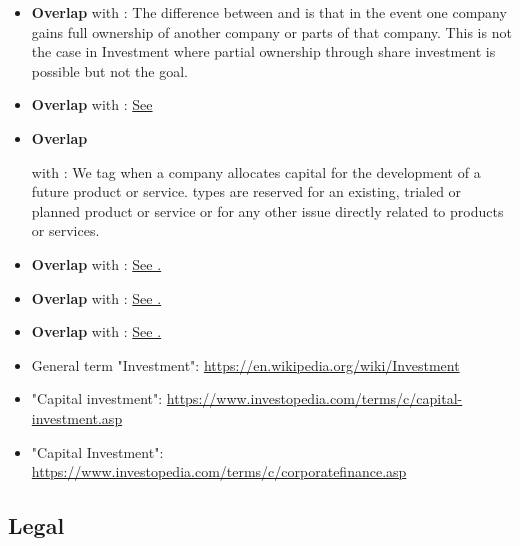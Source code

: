 \begin{itemize}[noitemsep,leftmargin=*]
    \item \textbf{Overlap} with : The difference between  and  is that in the  event one company gains full ownership of another company or parts of that company. This is not the case in Investment where partial ownership through share investment is possible but not the goal.
    \item \textbf{Overlap} with : \hyperlink{dealvsinvestment}{See }
    \item \hypertarget{investmentvsproductservice}{\textbf{Overlap}} with : We tag  when a company allocates capital for the development of a future product or service.  types are reserved for an existing, trialed or planned product or service or for any other issue directly related to products or services.
    \item \textbf{Overlap} with : \hyperlink{facilityvsinvestment}{See .}
    \item \textbf{Overlap} with : \hyperlink{financingvsinvestment}{See .}
    \item \textbf{Overlap} with : \hyperlink{expensevssalesvolume}{See .}
    \item General term "Investment": \url{https://en.wikipedia.org/wiki/Investment}
	\item "Capital investment": \url{https://www.investopedia.com/terms/c/capital-investment.asp}
	\item "Capital Investment": \url{https://www.investopedia.com/terms/c/corporatefinance.asp}
\end{itemize}

\vspace{0.5cm}

\subsection{Legal}

